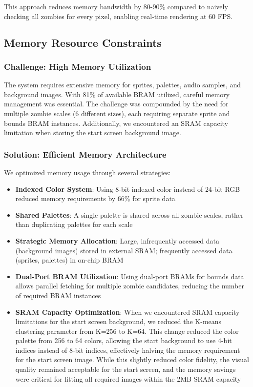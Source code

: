 \documentclass[12pt,a4paper]{article}
\begin{document}
This approach reduces memory bandwidth by 80-90\% compared to naively checking all zombies for every pixel, enabling real-time rendering at 60 FPS.

\subsection{Memory Resource Constraints}

\subsubsection{Challenge: High Memory Utilization}
The system requires extensive memory for sprites, palettes, audio samples, and background images. With 81\% of available BRAM utilized, careful memory management was essential. The challenge was compounded by the need for multiple zombie scales (6 different sizes), each requiring separate sprite and bounds BRAM instances. Additionally, we encountered an SRAM capacity limitation when storing the start screen background image.

\subsubsection{Solution: Efficient Memory Architecture}
We optimized memory usage through several strategies:
\begin{itemize}
    \item \textbf{Indexed Color System}: Using 8-bit indexed color instead of 24-bit RGB reduced memory requirements by 66\% for sprite data
    \item \textbf{Shared Palettes}: A single palette is shared across all zombie scales, rather than duplicating palettes for each scale
    \item \textbf{Strategic Memory Allocation}: Large, infrequently accessed data (background images) stored in external SRAM; frequently accessed data (sprites, palettes) in on-chip BRAM
    \item \textbf{Dual-Port BRAM Utilization}: Using dual-port BRAMs for bounds data allows parallel fetching for multiple zombie candidates, reducing the number of required BRAM instances
    \item \textbf{SRAM Capacity Optimization}: When we encountered SRAM capacity limitations for the start screen background, we reduced the K-means clustering parameter from K=256 to K=64. This change reduced the color palette from 256 to 64 colors, allowing the start background to use 4-bit indices instead of 8-bit indices, effectively halving the memory requirement for the start screen image. While this slightly reduced color fidelity, the visual quality remained acceptable for the start screen, and the memory savings were critical for fitting all required images within the 2MB SRAM capacity
\end{itemize}
\end{document}
